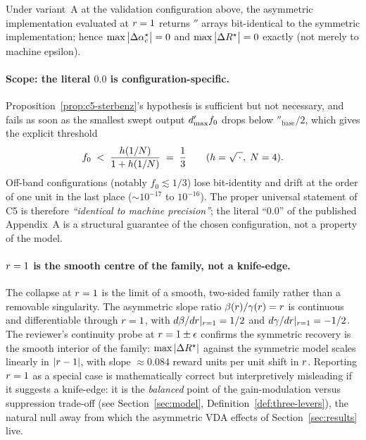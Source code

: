 \begin{proposition}
\label{prop:c5-sterbenz}
Under variant~A at the validation configuration above, the asymmetric
implementation evaluated at $r = 1$ returns
$\dprime$ arrays bit-identical to the symmetric implementation; hence
$\max\big|\Delta \alpha_c^\star\big| = 0$ and
$\max\big|\Delta R^\star\big| = 0$ exactly (not merely to machine
epsilon).
\end{proposition}

\paragraph{Scope: the literal $0.0$ is configuration-specific.}
Proposition~\ref{prop:c5-sterbenz}'s hypothesis is sufficient but not
necessary, and fails as soon as the smallest swept output
$d'_{\max} f_0$ drops below $\dprime_{\mathrm{base}}/2$, which gives
the explicit threshold
\begin{equation}
\label{eq:c5-sterbenz-threshold}
f_0 \;<\; \frac{h(1/N)}{1 + h(1/N)}
\;=\; \frac{1}{3}
\qquad (h = \sqrt{\,\cdot\,},\; N = 4).
\end{equation}
Off-band configurations (notably $f_0 \lesssim 1/3$) lose bit-identity
and drift at the order of one unit in the last place ($\sim 10^{-17}$
to $10^{-16}$). The proper universal statement of C5 is therefore
\emph{``identical to machine precision''}; the literal ``$0.0$'' of
the published Appendix~A is a structural guarantee of the chosen
configuration, not a property of the model.

\paragraph{$r = 1$ is the smooth centre of the family, not a
knife-edge.}
The collapse at $r = 1$ is the limit of a smooth, two-sided
family rather than a removable singularity. The asymmetric slope ratio
$\beta(r)/\gamma(r) = r$ is continuous and
differentiable through $r = 1$, with
$d\beta/dr|_{r=1} = 1/2$ and
$d\gamma/dr|_{r=1} = -1/2$. The reviewer's continuity probe
at $r = 1 \pm \epsilon$ confirms the symmetric recovery is the
smooth interior of the family: $\max|\Delta R^\star|$ against the
symmetric model scales linearly in $|r - 1|$, with slope
$\approx 0.084$ reward units per unit shift in $r$. Reporting
$r = 1$ as a special case is mathematically correct but
interpretively misleading if it suggests a knife-edge: it is the
\emph{balanced} point of the gain-modulation versus suppression
trade-off (see Section~\ref{sec:model}, Definition~\ref{def:three-levers}),
the natural null away from which the asymmetric VDA effects of
Section~\ref{sec:results} live.

